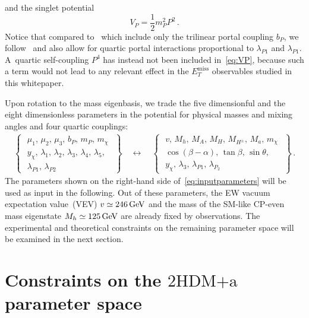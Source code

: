 \documentclass[a4paper, 11pt,notoc]{article}
\newcommand{\MET}{\ensuremath{E_T^\mathrm{miss}}\xspace}
\newcommand{\hdma}{\ensuremath{\textrm{2HDM+a}}\xspace}
\begin{document}
and the singlet potential
\begin{equation} \label{eq:VP}
V_{P}  =  \frac{1}{2}  m_P^2  P^2  \,.
\end{equation}
Notice that compared to~\cite{Ipek:2014gua,No:2015xqa,Goncalves:2016iyg,Tunney:2017yfp} which include only the trilinear portal coupling $b_P$, we  follow~\cite{Bauer:2017ota} and also allow for quartic portal interactions proportional to $\lambda_{P1}$ and  $\lambda_{P1}$. A~quartic self-coupling $P^4$ has instead not been included in~\eqref{eq:VP}, because such a term would not lead to any relevant effect in the $\MET$ observables studied in this whitepaper.

Upon rotation to the mass eigenbasis, we trade the five dimensionful and the eight dimensionless parameters in the potential  for physical masses and mixing angles and four quartic couplings:
\begin{align} \label{eq:inputparameters}
\left\{ \,\,\begin{matrix}
\mu_1,\,\mu_2,\,\mu_3,\,b_P,\,m_P,\,m_\chi\\[3pt]
y_\chi,\,\lambda_1,\,\lambda_2,\,\lambda_3,\,\lambda_4,\,\lambda_5,\\
\lambda_{P1},\,\lambda_{P2}
\end{matrix}\,\,\right\}\quad  \longleftrightarrow  \quad \left\{ \,\,\begin{matrix}
v,\,M_h,\,M_A,\,M_H,\,M_{H^\pm},\,M_a,\,m_\chi \\[3pt]
\cos(\beta-\alpha),\,\tan \beta,\,\sin  \theta,\\[3pt]
y_\chi,\,\lambda_3,\,\lambda_{P1},\,\lambda_{P_2}
\end{matrix}\,\,\right\}\,.
\end{align}
The parameters shown on the right-hand side of~\eqref{eq:inputparameters} will be used as input in the following. Out of these  parameters, the EW vacuum expectation value~(VEV) $v \simeq 246 \, {\rm GeV}$ and the mass of the SM-like CP-even mass eigenstate $M_h \simeq 125 \, {\rm GeV}$ are already fixed by observations. The experimental and theoretical constraints on the remaining parameter space will be examined in the next section. 


\section{Constraints on the \hdma parameter space}
\label{sec:constraints}
\end{document}
